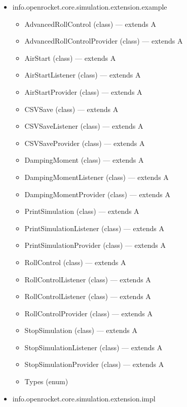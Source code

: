\documentclass{amsdtx}
\begin{document}
\begin{itemize}
\begin{itemize}
\begin{itemize}
    \item
      AbstractSimulationExtension (class) --- extends A
    \item
      AbstractSimulationExtensionProvider (class) --- implements S
    \item
      SimulationExtension (interface)
    \item
      SimulationExtensionConfiguration (class) --- extends H
    \item
      SimulationExtensionProvider (interface)
    \item
      name (class)
    \item
      naming (class)
    \item
      of (class)
    \end{itemize}
  \item
    info.openrocket.core.simulation.extension.example

    \begin{itemize}
    
    \item
      AdvancedRollControl (class) --- extends A
    \item
      AdvancedRollControlProvider (class) --- extends A
    \item
      AirStart (class) --- extends A
    \item
      AirStartListener (class) --- extends A
    \item
      AirStartProvider (class) --- extends A
    \item
      CSVSave (class) --- extends A
    \item
      CSVSaveListener (class) --- extends A
    \item
      CSVSaveProvider (class) --- extends A
    \item
      DampingMoment (class) --- extends A
    \item
      DampingMomentListener (class) --- extends A
    \item
      DampingMomentProvider (class) --- extends A
    \item
      PrintSimulation (class) --- extends A
    \item
      PrintSimulationListener (class) --- extends A
    \item
      PrintSimulationProvider (class) --- extends A
    \item
      RollControl (class) --- extends A
    \item
      RollControlListener (class) --- extends A
    \item
      RollControlListener (class) --- extends A
    \item
      RollControlProvider (class) --- extends A
    \item
      StopSimulation (class) --- extends A
    \item
      StopSimulationListener (class) --- extends A
    \item
      StopSimulationProvider (class) --- extends A
    \item
      Types (enum)
    \end{itemize}
  \item
    info.openrocket.core.simulation.extension.impl


\end{itemize}
\end{itemize}
\end{document}
